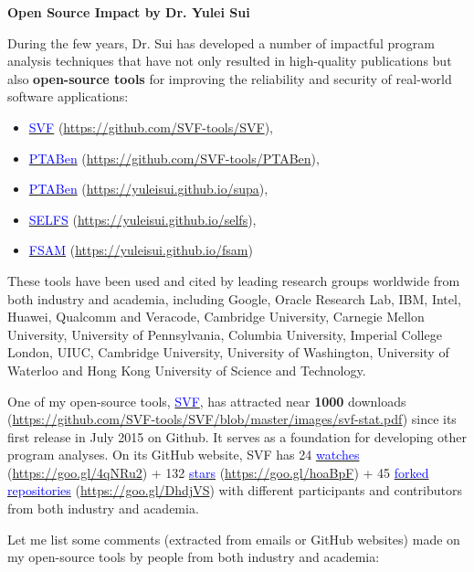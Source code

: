\documentclass[12pt]{article}
\begin{document}
\centerline{\Large \bf Open Source Impact by Dr. Yulei Sui}
\bigskip
\bigskip

During the few years, Dr. Sui has 
developed a number of impactful 
program analysis techniques that have not only 
resulted in high-quality publications but also 
\textbf{open-source tools} for improving the reliability
and security of real-world software applications:
\begin{itemize}
\setlength\itemsep{-0.2em}
\item \href{https://github.com/SVF-tools/SVF}{\textcolor{blue}{SVF}} (\url{https://github.com/SVF-tools/SVF}), 
\item \href{https://github.com/SVF-tools/PTABen}{\textcolor{blue}{PTABen}} (\url{https://github.com/SVF-tools/PTABen}), 
\item \href{https://yuleisui.github.io/supa}{\textcolor{blue}{PTABen}} (\url{https://yuleisui.github.io/supa}), 
\item \href{https://yuleisui.github.io/selfs}{\textcolor{blue}{SELFS}} (\url{https://yuleisui.github.io/selfs}), 
\item \href{https://yuleisui.github.io/fsam}{\textcolor{blue}{FSAM}} (\url{https://yuleisui.github.io/fsam}) 
\end{itemize}
These tools have been used and cited by leading research groups worldwide from both industry and academia, including Google, Oracle Research Lab, IBM, Intel, Huawei, Qualcomm and Veracode, Cambridge University, Carnegie Mellon University, University of Pennsylvania, Columbia University, Imperial College London, UIUC, Cambridge University, University of Washington, University of Waterloo and Hong Kong University of Science and Technology.


One of my open-source tools, \href{https://github.com/SVF-tools/SVF}{\textcolor{blue}{SVF}}, has attracted near \textbf{1000} downloads (\url{https://github.com/SVF-tools/SVF/blob/master/images/svf-stat.pdf}) since its first release in July 2015 on Github. 
It serves as a foundation for developing other
program analyses. On its GitHub website, SVF  has 24 \href{https://goo.gl/4qNRu2}{\textcolor{blue}{watches}} (\url{https://goo.gl/4qNRu2}) + 132 \href{https://goo.gl/hoaBpF}{\textcolor{blue}{stars}} (\url{https://goo.gl/hoaBpF}) + 45 \href{https://goo.gl/w1gjKB}{\textcolor{blue}{forked repositories}} (\url{https://goo.gl/DhdjVS}) with different participants and contributors from both industry and academia.

Let me list some comments (extracted from emails or GitHub websites) made on my open-source tools by people from both industry and academia:
\end{document}
